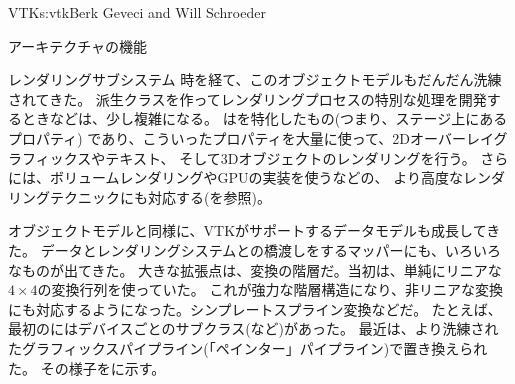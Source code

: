 \begin{aosachapter}{VTK}{s:vtk}{Berk Geveci and Will Schroeder}
\begin{aosasect1}{アーキテクチャの機能}
\begin{aosasect2}{レンダリングサブシステム}
時を経て、このオブジェクトモデルもだんだん洗練されてきた。
派生クラスを作ってレンダリングプロセスの特別な処理を開発するときなどは、少し複雑になる。
はを特化したもの(つまり、ステージ上にあるプロパティ)
であり、こういったプロパティを大量に使って、2Dオーバーレイグラフィックスやテキスト、
そして3Dオブジェクトのレンダリングを行う。
さらには、ボリュームレンダリングやGPUの実装を使うなどの、
より高度なレンダリングテクニックにも対応する(を参照)。

オブジェクトモデルと同様に、VTKがサポートするデータモデルも成長してきた。
データとレンダリングシステムとの橋渡しをするマッパーにも、いろいろなものが出てきた。
大きな拡張点は、変換の階層だ。当初は、単純にリニアな$4{\times}4$の変換行列を使っていた。
これが強力な階層構造になり、非リニアな変換にも対応するようになった。シンプレートスプライン変換などだ。
たとえば、最初のにはデバイスごとのサブクラス(など)があった。
最近は、より洗練されたグラフィックスパイプライン(「ペインター」パイプライン)で置き換えられた。
その様子をに示す。



\end{aosasect2}
\end{aosasect1}
\end{aosachapter}
